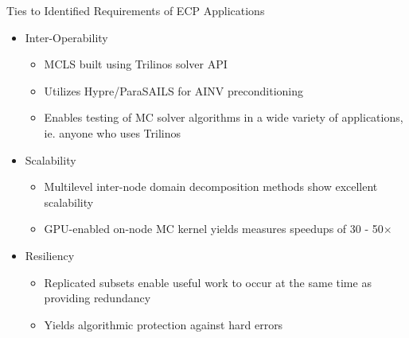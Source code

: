 \documentclass{beamer}
\begin{document}
\begin{frame}{Ties to Identified Requirements of ECP Applications}

  \begin{itemize}

  \item Inter-Operability
    \begin{itemize}
    \item MCLS built using Trilinos solver API
    \item Utilizes Hypre/ParaSAILS for AINV preconditioning
    \item Enables testing of MC solver algorithms in a wide variety of
      applications, ie. anyone who uses Trilinos
    \end{itemize}

  \item Scalability
    \begin{itemize}
    \item Multilevel inter-node domain decomposition methods show excellent
      scalability
    \item GPU-enabled on-node MC kernel yields measures speedups of 30 -
      50$\times$
    \end{itemize}

  \item Resiliency
    \begin{itemize}
    \item Replicated subsets enable useful work to occur at the same time as
      providing redundancy
    \item Yields algorithmic protection against hard errors
    \end{itemize}
  \end{itemize}

\end{frame}

\end{document}
